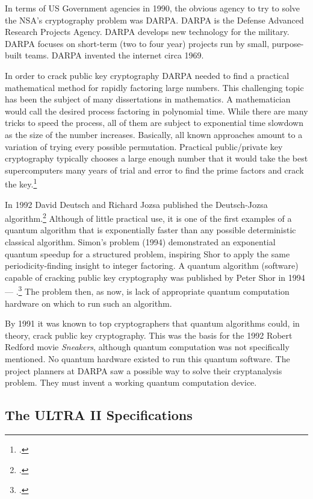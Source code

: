 In terms of US Government agencies in 1990, the obvious agency to try to solve the NSA's cryptography problem was DARPA.  DARPA is the Defense Advanced Research Projects Agency.  DARPA develops new technology for the military.  DARPA focuses on short-term (two to four year) projects run by small, purpose-built teams.  DARPA invented the internet circa 1969.

In order to crack public key cryptography DARPA needed to find a practical mathematical method for rapidly factoring large numbers.  This challenging topic has been the subject of many dissertations in mathematics.  A mathematician would call the desired process factoring in polynomial time.  While there are many tricks to speed the process, all of them are subject to exponential time slowdown as the size of the number increases.  Basically, all known approaches amount to a variation of trying every possible permutation.  Practical public/private key cryptography typically chooses a large enough number that it would take the best supercomputers many years of trial and error to find the prime factors and crack the key.\footcite{ferguson2010}

In 1992 David Deutsch and Richard Jozsa published the Deutsch-Jozsa algorithm.\footcite{deutschjozsa1992}  Although of little practical use, it is one of the first examples of a quantum algorithm that is exponentially faster than any possible deterministic classical algorithm.  Simon's problem (1994) demonstrated an exponential quantum speedup for a structured problem, inspiring Shor to apply the same periodicity-finding insight to integer factoring.  A quantum algorithm (software) capable of cracking public key cryptography was published by Peter Shor in 1994 --- .\footcite{shor1994}   The problem then, as now, is lack of appropriate quantum computation hardware on which to run such an algorithm.

By 1991 it was known to top cryptographers that quantum algorithms could, in theory, crack public key cryptography.  This was the basis for the 1992 Robert Redford movie \textit{Sneakers}, although quantum computation was not specifically mentioned.  No quantum hardware existed to run this quantum software.  The project planners at DARPA saw a possible way to solve their cryptanalysis problem.  They must invent a working quantum computation device.

\subsection*{The ULTRA II Specifications}
\label{spine:fg-the-ultra-ii-specifications}

